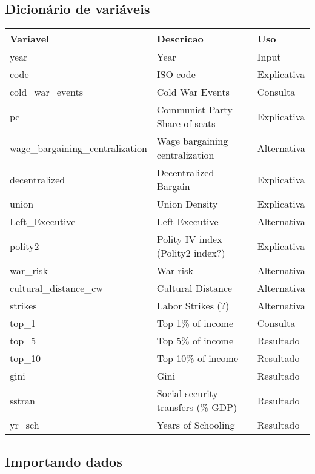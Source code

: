 \documentclass[11pt]{article}
\begin{document}
\subsection*{Dicionário de variáveis}
\label{sec:orga607e20}

\begin{table}[htbp]
\label{dicionario}
\centering
\begin{tabular}{lll}
\hline
Variavel & Descricao & Uso\\
\hline
year & Year & Input\\
code & ISO code & Explicativa\\
cold\_war\_events & Cold War Events & Consulta\\
pc & Communist Party Share of seats & Explicativa\\
wage\_bargaining\_centralization & Wage bargaining centralization & Alternativa\\
decentralized & Decentralized Bargain & Explicativa\\
union & Union Density & Explicativa\\
Left\_Executive & Left Executive & Alternativa\\
polity2 & Polity IV index (Polity2 index?) & Explicativa\\
war\_risk & War risk & Alternativa\\
cultural\_distance\_cw & Cultural Distance & Alternativa\\
strikes & Labor Strikes (?) & Alternativa\\
top\_1 & Top 1\% of income & Consulta\\
top\_5 & Top 5\% of income & Resultado\\
top\_10 & Top 10\% of income & Resultado\\
gini & Gini & Resultado\\
sstran & Social security transfers (\% GDP) & Resultado\\
yr\_sch & Years of Schooling & Resultado\\
\hline
\end{tabular}
\end{table}

\subsection*{Importando dados}
\label{sec:orgd0ebcb9}
\end{document}
